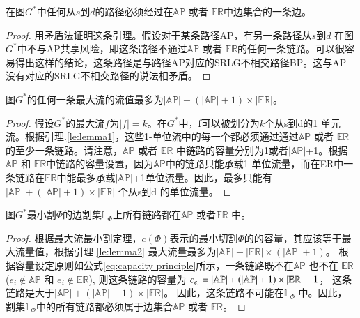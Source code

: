 \begin{lemma}
\label{le:lemma1}
    在图$G^*$中任何从$s$到$d$的路径必须经过在$\mathbb{AP}$ 或者 $\mathbb{\mathbb{ER}}$中边集合的一条边。
\end{lemma}
\begin{proof}
用矛盾法证明这条引理。假设对于某条路径AP，有另一条路径从$s$到$d$ 在图$G^*$中不与AP共享风险，即这条路径不通过$\mathbb{AP}$ 或者 $\mathbb{\mathbb{ER}}$的任何一条链路。可以很容易得出这样的结论，这条路径是与路径AP对应的SRLG不相交路径BP。这与AP 没有对应的SRLG不相交路径的说法相矛盾。
\end{proof}

\begin{lemma}
\label{le:lemma2}
    图$G^*$的任何一条最大流的流值最多为$|\mathbb{AP}|+(|\mathbb{AP}|+1)\times|\mathbb{\mathbb{ER}}|$。
\end{lemma}
\begin{proof}
假设$G^*$的最大流$f$为$|f|=k$。在$G^*$中，f可以被划分为$k$个从s到d的1 单元流。根据引理.\ref{le:lemma1}，这些1-单位流中的每一个都必须通过通过$\mathbb{AP}$ 或者 $\mathbb{\mathbb{ER}}$的至少一条链路。请注意，$\mathbb{AP}$ 或者 $\mathbb{\mathbb{ER}}$ 中链路的容量分别为1或者$|\mathbb{AP}|$+1。根据$\mathbb{AP}$ 和 $\mathbb{\mathbb{ER}}$中链路的容量设置，因为$\mathbb{AP}$中的链路只能承载1-单位流量，而在ER中一条链路在$\mathbb{ER}$中能最多承载$|\mathbb{AP}|$+1单位流量。因此，最多只能有$|\mathbb{AP}|+ (|\mathbb{AP}|+1)\times|\mathbb{\mathbb{ER}}|$ 个从s到d 的单位流量。
\end{proof}

\begin{lemma}
\label{le:lemma3}
    图$G^*$最小割$\Phi$的边割集$\mathbb{L}_{\Phi}$上所有链路都在$\mathbb{AP}$ 或者$\mathbb{\mathbb{ER}}$ 中。
\end{lemma}

\begin{proof}
根据最大流最小割定理，$c(\Phi)$表示的最小切割$\Phi$的的容量，其应该等于最大流量值，根据引理 \ref{le:lemma2} 最大流量最多为$|\mathbb{AP}|+ |\mathbb{ER}|\times (|\mathbb{AP}|+1)$。 根据容量设定原则如公式\ref{eq:capacity principle}所示，一条链路既不在$\mathbb{AP}$ 也不在 $\mathbb{ER}$ ($e_i \notin \mathbb{AP}$ 和 $e_i \notin \mathbb{ER}$), 则这条链路的容量为 $c_{e_i} = \left| {{\rm\mathbb{AP}}} \right| + \left( {\left| {{\rm\mathbb{AP}}} \right| + 1} \right)\times \left| {{\rm{\mathbb{E}}}{{\rm{\mathbb{R}}}}} \right| + 1$， 这条链路是大于$|\mathbb{AP}|+(|\mathbb{AP}|+1)\times |\mathbb{ER}|$。 因此，这条链路不可能在$\mathbb{L}_{\Phi}$ 中。因此，割集$\mathbb{L}_{\Phi}$中的所有链路都必须属于边集合$\mathbb{AP}$ 或者 $\mathbb{ER}$。
\end{proof}


